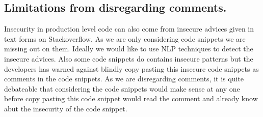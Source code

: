 
\noindent
\subsection{Limitations from disregarding comments.} Insecurity in production level code can also come from 
insecure advices given in text forms on Stackoverflow. 
As we are only considering code snippets we are missing out on them. 
Ideally we would like to use NLP techniques to detect the insecure advices. Also some code snippets do contains insecure patterns 
but the developers has warned against blindly copy pasting this insecure code snippets as comments in the code snippets. As we are disregarding
comments, it is quite debateable that considering the code snippets would make sense at any one before copy pasting this
code snippet would read the comment and already know abut the insecurity of the code snippet.     